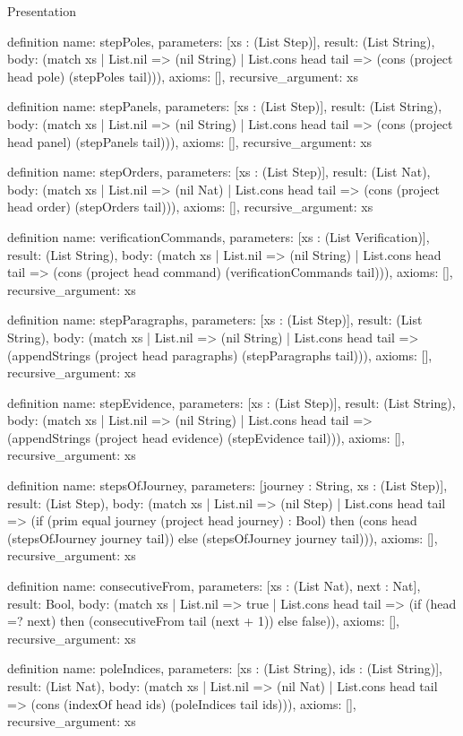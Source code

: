 \begin{lexlean}{Presentation}
\begin{semanticmodule}
definition{
  name: stepPoles,
  parameters: [xs : (List Step)],
  result: (List String),
  body: (match xs
    | List.nil => (nil String)
    | List.cons head tail => (cons (project head pole) (stepPoles tail))),
  axioms: [],
  recursive_argument: xs
}

definition{
  name: stepPanels,
  parameters: [xs : (List Step)],
  result: (List String),
  body: (match xs
    | List.nil => (nil String)
    | List.cons head tail => (cons (project head panel) (stepPanels tail))),
  axioms: [],
  recursive_argument: xs
}

definition{
  name: stepOrders,
  parameters: [xs : (List Step)],
  result: (List Nat),
  body: (match xs
    | List.nil => (nil Nat)
    | List.cons head tail => (cons (project head order) (stepOrders tail))),
  axioms: [],
  recursive_argument: xs
}

definition{
  name: verificationCommands,
  parameters: [xs : (List Verification)],
  result: (List String),
  body: (match xs
    | List.nil => (nil String)
    | List.cons head tail => (cons (project head command) (verificationCommands tail))),
  axioms: [],
  recursive_argument: xs
}

definition{
  name: stepParagraphs,
  parameters: [xs : (List Step)],
  result: (List String),
  body: (match xs
    | List.nil => (nil String)
    | List.cons head tail => (appendStrings (project head paragraphs) (stepParagraphs tail))),
  axioms: [],
  recursive_argument: xs
}

definition{
  name: stepEvidence,
  parameters: [xs : (List Step)],
  result: (List String),
  body: (match xs
    | List.nil => (nil String)
    | List.cons head tail => (appendStrings (project head evidence) (stepEvidence tail))),
  axioms: [],
  recursive_argument: xs
}

definition{
  name: stepsOfJourney,
  parameters: [journey : String, xs : (List Step)],
  result: (List Step),
  body: (match xs
    | List.nil => (nil Step)
    | List.cons head tail => (if (prim equal journey (project head journey) : Bool) then (cons head (stepsOfJourney journey tail)) else (stepsOfJourney journey tail))),
  axioms: [],
  recursive_argument: xs
}

definition{
  name: consecutiveFrom,
  parameters: [xs : (List Nat), next : Nat],
  result: Bool,
  body: (match xs
    | List.nil => true
    | List.cons head tail => (if (head =? next) then (consecutiveFrom tail (next + 1)) else false)),
  axioms: [],
  recursive_argument: xs
}

definition{
  name: poleIndices,
  parameters: [xs : (List String), ids : (List String)],
  result: (List Nat),
  body: (match xs
    | List.nil => (nil Nat)
    | List.cons head tail => (cons (indexOf head ids) (poleIndices tail ids))),
  axioms: [],
  recursive_argument: xs
}


\end{semanticmodule}
\end{lexlean}
